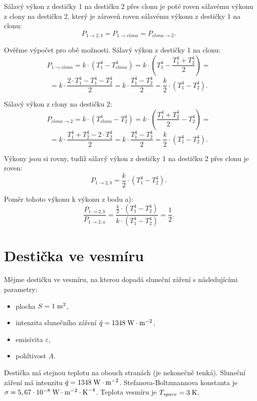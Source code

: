 \documentclass{article}
\begin{document}
Sálavý výkon z destičky 1 na destičku 2 přes clonu je poté roven sálavému výkonu z clony na destičku 2, který je zároveň roven sálavému výkonu z destičky 1 na clonu:
$$
    P_{1 \rightarrow 2,b} = P_{1 \rightarrow clona} = P_{clona \rightarrow 2}.
$$

Ověřme výpočet pro obě možnosti. Sálavý výkon z destičky 1 na clonu:
$$
    P_{1 \rightarrow clona} = k \cdot \left( T_1^4 - T_{clona}^4 \right) = k \cdot \left( T_1^4 - \frac{T_1^4 + T_2^4}{2} \right) =
$$
$$
    = k \cdot \frac{2 \cdot T_1^4 - T_1^4 - T_2^4}{2} = k \cdot \frac{T_1^4 - T_2^4}{2} = \frac{k}{2} \cdot \left( T_1^4 - T_2^4 \right).
$$

Sálavý výkon z clony na destičku 2:
$$
    P_{clona \rightarrow 2} = k \cdot \left( T_{clona}^4 - T_2^4 \right) = k \cdot \left( \frac{T_1^4 + T_2^4}{2} - T_2^4 \right) =
$$
$$
    = k \cdot \frac{T_1^4 + T_2^4 - 2 \cdot T_2^4}{2} = k \cdot \frac{T_1^4 - T_2^4}{2} = \frac{k}{2} \cdot \left( T_1^4 - T_2^4 \right).
$$

Výkony jsou si rovny, tudíž sálavý výkon z destičky 1 na destičku 2 přes clonu je roven:
$$
    P_{1 \rightarrow 2,b} = \frac{k}{2} \cdot \left( T_1^4 - T_2^4 \right).
$$

Poměr tohoto výkonu k výkonu z bodu a):
$$
    \frac{P_{1 \rightarrow 2,b}}{P_{1 \rightarrow 2,a}} = \frac{\frac{k}{2} \cdot \left( T_1^4 - T_2^4 \right)}{k \cdot \left( T_1^4 - T_2^4 \right)} = \frac{1}{2}.
$$

\newpage



\section{ Destička ve vesmíru \spicy \spicy}
Mějme destičku ve vesmíru, na kterou dopadá sluneční záření s následujícími parametry:
\begin{itemize}
    \item plocha $S = 1 \; \textrm{m}^{\textrm{2}}$,
    \item intenzita slunečního záření $\dot{q} = 1348 \; \textrm{W} \cdot \textrm{m}^{-2}$,
    \item emisivita $\varepsilon$,
    \item pohltivost $A$.
\end{itemize}

Destička má stejnou teplotu na obouch stranách (je nekonečně tenká). Sluneční záření má intenzitu $\dot{q} = 1348 \; \textrm{W} \cdot \textrm{m}^{-2}$. Stefanova-Boltzmannova konstanta je $\sigma = 5,67 \cdot 10^{-8} \; \textrm{W} \cdot \textrm{m}^{-2} \cdot \textrm{K}^{-4}$. Teplota vesmíru je $T_{space} = 3 \; \textrm{K}$.\\
\end{document}
